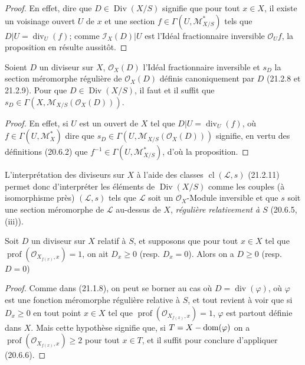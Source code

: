 \begin{proof}
En effet, dire que $D\in\operatorname{Div}(X/S)$ signifie que pour tout $x\in X$, il
existe un voisinage ouvert $U$ de $x$ et une section
$f\in\Gamma(U,\mathscr M_{X/S}^*)$ tels que $D|U=\operatorname{div}_U(f)$; comme
$\mathscr I_X(D)|U$ est l'Idéal fractionnaire inversible $\mathcal O_Uf$, la
proposition en résulte aussitôt.
\end{proof}

\begin{proposition}[21.15.5]
\label{IV.21.15.5}
Soient $D$ un diviseur sur $X$, $\mathcal O_X(D)$ l'Idéal fractionnaire inversible et
$s_D$ la section méromorphe régulière de $\mathcal O_X(D)$ définis canoniquement par
$D$ \textup{(21.2.8 et 21.2.9)}. Pour que $D\in\operatorname{Div}(X/S)$, il faut et il suffit
que $s_D\in\Gamma(X,\mathscr M_{X/S}(\mathcal O_X(D)))$.
\end{proposition}

\begin{proof}
En effet, si $U$ est un ouvert de $X$ tel que $D|U=\operatorname{div}_U(f)$, où
$f\in\Gamma(U,\mathscr M_X^*)$ dire que
$s_D\in\Gamma(U,\mathscr M_{X/S}(\mathcal O_X(D)))$ signifie, en vertu des
définitions (20.6.2) que $f^{-1}\in\Gamma(U,\mathscr M_{X/S}^*)$, d'où la
proposition.
\end{proof}

L'interprétation des diviseurs sur $X$ à l'aide des classes
$\operatorname{cl}(\mathscr L,s)$ (21.2.11) permet donc d'interpréter les éléments de
$\operatorname{Div}(X/S)$ comme les couples (à isomorphisme près) $(\mathscr L,s)$
tels que $\mathscr L$ soit un $\mathcal O_X$-Module inversible et que $s$ soit une
section méromorphe de $\mathscr L$ au-dessus de $X$, \emph{régulière relativement à
$S$} (20.6.5, (iii)).

\begin{proposition}[21.15.6]
\label{IV.21.15.6}
Soit $D$ un diviseur sur $X$ relatif à $S$, et supposons que pour tout $x\in X$ tel
que $\operatorname{prof}(\mathcal O_{X_{f(x)},x})=1$, on ait $D_x\geq0$
\textup{(resp. $D_x=0$)}. Alors on a $D\geq0$ \textup{(resp. $D=0$)}
\end{proposition}

\begin{proof}
Comme dans (21.1.8), on peut se borner au cas où $D=\operatorname{div}(\varphi)$, où
$\varphi$ est une fonction méromorphe régulière relative à $S$, et tout revient à voir
que si $D_x\geq0$ en tout point $x\in X$ tel que
$\operatorname{prof}(\mathcal O_{X_{f(x)},x})=1$, $\varphi$ est partout définie dans
$X$. Mais cette hypothèse signifie que, si $T=X-\operatorname{dom}(\varphi)$ on a
$\operatorname{prof}(\mathcal O_{X_{f(x)},x})\geq2$ pour tout $x\in T$, et il suffit
pour conclure d'appliquer (20.6.6).
\end{proof}

